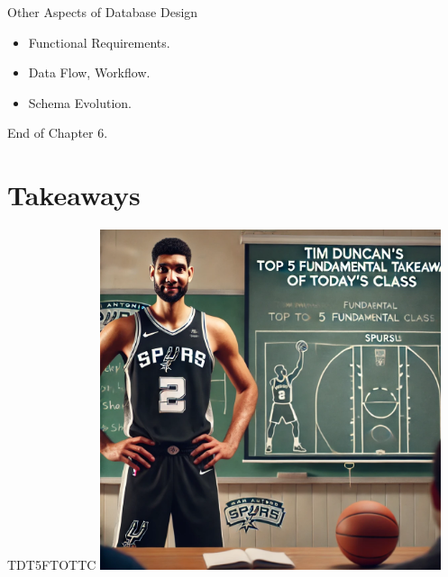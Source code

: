 \documentclass{beamer}
\begin{document}
\begin{frame}{Other Aspects of Database Design}
    \begin{itemize}
        \item Functional Requirements.
        \item Data Flow, Workflow.
        \item Schema Evolution.
    \end{itemize}
\end{frame}


\begin{frame}{}
     \centering
     \Huge End of Chapter 6.
\end{frame}

\section*{Takeaways}

\begin{frame}{TDT5FTOTTC}
    \centering
    \includegraphics[width=0.75\textwidth]{figures/tim.png}
\end{frame}
\end{document}
